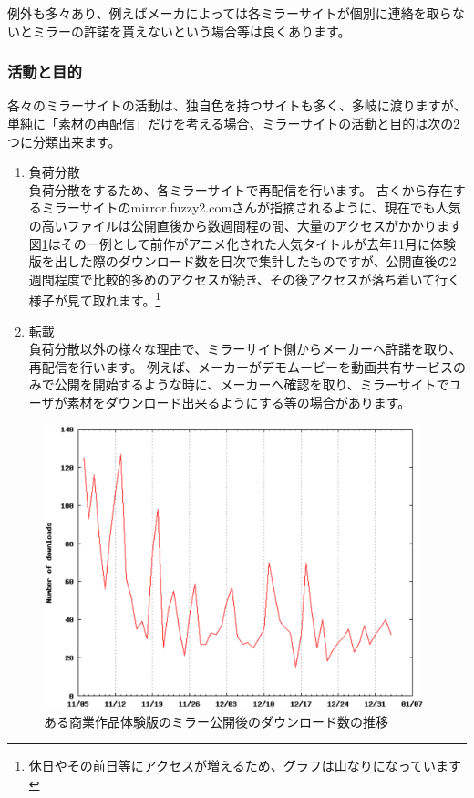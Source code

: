 例外も多々あり、例えばメーカによっては各ミラーサイトが個別に連絡を取らないとミラーの許諾を貰えないという場合等は良くあります。

\subsubsection{活動と目的}
各々のミラーサイトの活動は、独自色を持つサイトも多く、多岐に渡りますが、単純に「素材の再配信」だけを考える場合、ミラーサイトの活動と目的は次の2つに分類出来ます。\cite{fuzzy2_2}
\begin{enumerate}
 \item 負荷分散\\
  負荷分散をするため、各ミラーサイトで再配信を行います。
  古くから存在するミラーサイトのmirror.fuzzy2.comさんが指摘されるように、現在でも人気の高いファイルは公開直後から数週間程の間、大量のアクセスがかかります\cite{fuzzy2_1}
  図\ref{fig:download-graph}はその一例として前作がアニメ化された人気タイトルが去年11月に体験版を出した際のダウンロード数を日次で集計したものですが、公開直後の2週間程度で比較的多めのアクセスが続き、その後アクセスが落ち着いて行く様子が見て取れます。\footnote{休日やその前日等にアクセスが増えるため、グラフは山なりになっています}

 \item 転載\\
  負荷分散以外の様々な理由で、ミラーサイト側からメーカーへ許諾を取り、再配信を行います。
  例えば、メーカーがデモムービーを動画共有サービスのみで公開を開始するような時に、メーカーへ確認を取り、ミラーサイトでユーザが素材をダウンロード出来るようにする等の場合があります。
\end{enumerate}

\begin{figure}[htbp]
 \begin{center}
  \includegraphics[width=110mm]{ijust3-mirror/img/download-graph.eps}
 \end{center}
 \caption{ある商業作品体験版のミラー公開後のダウンロード数の推移}
 \label{fig:download-graph}
\end{figure}

